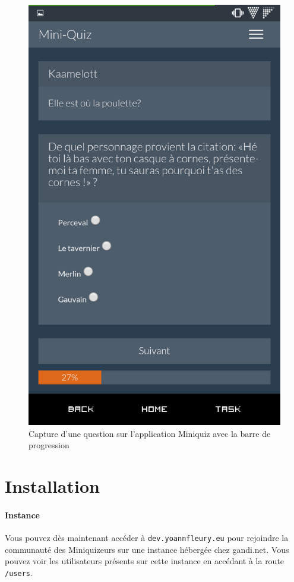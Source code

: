 \documentclass[12pt]{article}
\begin{document}
        \begin{figure}[!ht]
            \caption{\label{fig:miniquiz-progress-rwd} Capture d'une question sur l'application Miniquiz avec la barre de progression}
            \includegraphics[scale=0.2]{res/miniquiz-progress-rwd.png}
        \end{figure}
    

\section{Installation}
    \paragraph{Instance} Vous pouvez dès maintenant accéder à \texttt{dev.yoannfleury.eu} pour rejoindre la communauté des Miniquizeurs sur une instance hébergée chez gandi.net. Vous pouvez voir les utilisateurs présents sur cette instance en accédant à la route \texttt{/users}.
\end{document}
